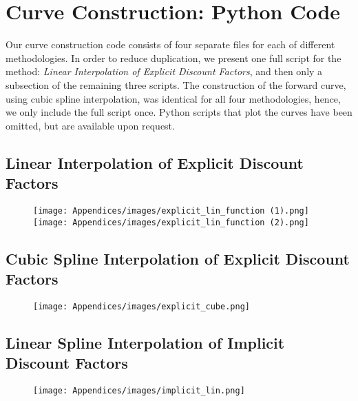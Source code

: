 
\section{Curve Construction: Python Code}
\label{python_code}

Our curve construction code consists of four separate files for each of different methodologies. In order to reduce duplication, we present one full script for the method: \textit{Linear Interpolation of Explicit Discount Factors}, and then only a subsection of the remaining three scripts. The construction of the forward curve, using cubic spline interpolation, was identical for all four methodologies, hence, we only include the full script once. Python scripts that plot the curves have been omitted, but are available upon request.

\newpage

\subsection{Linear Interpolation of Explicit Discount Factors}

\begin{figure}[ht]
\begin{center}
\texttt{[image: Appendices/images/explicit\_lin\_function (1).png]}
\texttt{[image: Appendices/images/explicit\_lin\_function (2).png]}
\end{center}
\end{figure}

\newpage

\subsection{Cubic Spline Interpolation of Explicit Discount Factors}

\begin{figure}[ht]
\begin{center}
\texttt{[image: Appendices/images/explicit\_cube.png]}
\end{center}
\end{figure}

\FloatBarrier

\subsection{Linear Spline Interpolation of Implicit Discount Factors}

\begin{figure}[ht]
\begin{center}
\texttt{[image: Appendices/images/implicit\_lin.png]}
\end{center}
\end{figure}

